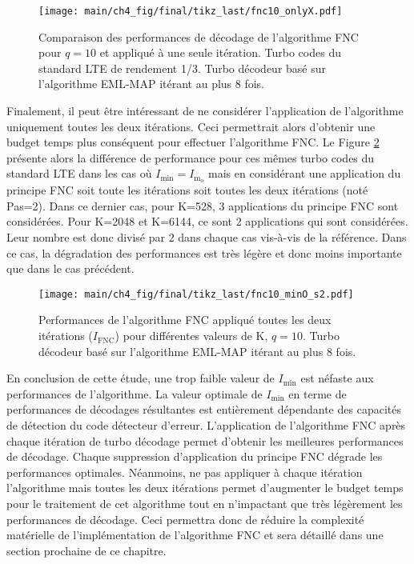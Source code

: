 \begin{figure}[!h]
	\centering
	\vspace*{-1em} 
	\hspace*{-.075\textwidth}
	\texttt{[image: main/ch4\_fig/final/tikz\_last/fnc10\_onlyX.pdf]}
	\caption{Comparaison des performances de décodage de l'algorithme FNC pour $q=10$ et appliqué à une seule itération. 
	Turbo codes du standard LTE de rendement 1/3. 
	Turbo décodeur basé sur l'algorithme EML-MAP itérant au plus 8 fois.
	\label{fig:fnc_onlyX}}
\end{figure}

Finalement, il peut être intéressant de ne considérer l'application de l'algorithme uniquement toutes les deux 
itérations. Ceci permettrait alors d'obtenir une budget temps plus conséquent pour effectuer l'algorithme FNC. Le Figure 
\ref{fig:fnc_step} présente alors la différence de performance pour ces mêmes turbo codes du standard LTE dans les cas
où $I_\text{min} = I_{\text{m}_\text{o}}$ mais en considérant une application du principe FNC soit toute les itérations 
soit toutes les deux itérations (noté Pas=2). Dans ce dernier cas, pour K=528, 3 applications du principe FNC sont 
considérées. Pour K=2048 et K=6144, ce sont 2 applications qui sont considérées. Leur nombre est donc divisé par 2 dans 
chaque cas vis-à-vis de la référence. Dans ce cas, la dégradation des performances est très légère et donc moins 
importante que dans le cas précédent.

\begin{figure}[!h]
	\centering
	\texttt{[image: main/ch4\_fig/final/tikz\_last/fnc10\_minO\_s2.pdf]}
	\caption{Performances de l'algorithme FNC appliqué toutes les deux itérations ($I_\text{FNC}$) pour différentes 
	valeurs de K, $q=10$.
	Turbo décodeur basé sur l'algorithme EML-MAP itérant au plus 8 fois.
	\label{fig:fnc_step}}
\end{figure}

En conclusion de cette étude, une trop faible valeur de $I_\text{min}$ est néfaste aux performances de l'algorithme. 
La valeur optimale de $I_\text{min}$ en terme de performances de décodages résultantes est entièrement dépendante des
capacités de détection du code détecteur d'erreur. L'application de l'algorithme FNC après chaque itération de turbo 
décodage permet d'obtenir les meilleures performances de décodage. Chaque suppression d'application du principe FNC 
dégrade les performances optimales. Néanmoins, ne pas appliquer à chaque itération l'algorithme mais toutes les deux 
itérations permet d'augmenter le budget temps pour le traitement de cet algorithme tout en n'impactant que très légèrement 
les performances de décodage. Ceci permettra donc de réduire la complexité matérielle de 
l'implémentation de l'algorithme FNC et sera détaillé dans une section prochaine de ce chapitre.

